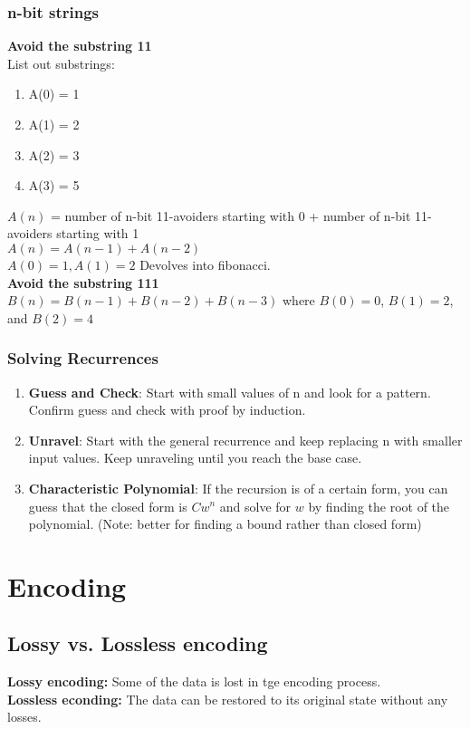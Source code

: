 \documentclass{article}
\begin{document}
\begin{spacing}{1.5}
\subsubsection{n-bit strings}
\label{sec:nstring}
\textbf{Avoid the substring 11}\\
List out substrings:
\begin{enumerate}
    \item A(0) = 1
    \item A(1) = 2
    \item A(2) = 3
    \item A(3) = 5
\end{enumerate}
$A(n)$ = number of n-bit 11-avoiders starting with 0 + number of n-bit 11-avoiders starting with 1\\
$A(n) = A(n-1) + A(n-2)$\\
$A(0) = 1, A(1) = 2$
Devolves into fibonacci.\\
\textbf{Avoid the substring 111}\\
$B(n)=B(n-1)+B(n-2)+B(n-3)$ where $B(0)=0$, $B(1)=2$, and $B(2)=4$

\subsubsection{Solving Recurrences}
\label{sec:solver}
\begin{enumerate}
    \item \textbf{Guess and Check}: Start with small values of n and look for a pattern. Confirm guess and check with proof by induction.
    \item \textbf{Unravel}: Start with the general recurrence and keep replacing n with smaller input values. Keep unraveling until you reach the base case.
    \item \textbf{Characteristic Polynomial}: If the recursion is of a certain form, you can guess that the closed form is $Cw^n$ and solve for $w$ by finding the root of the polynomial. (Note: better for finding a bound rather than closed form)
\end{enumerate}

\section{Encoding}
\label{sec:encoding}
\subsection{Lossy vs. Lossless encoding}
\textbf{Lossy encoding:} Some of the data is lost in tge encoding process.\\
\textbf{Lossless econding:} The data can be restored to its original state without any losses. 
\label{sec:loss}

\end{spacing}
\end{document}
